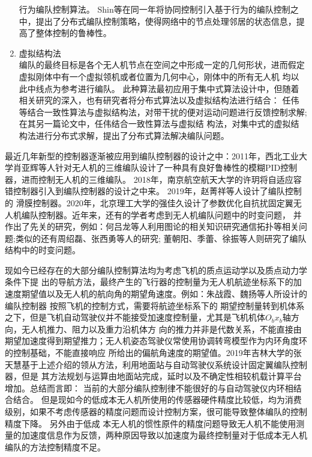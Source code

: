 \begin{enumerate}
        行为编队控制算法。\cite{DuanHaiBin2015}
        Shin等在同一年将协同控制引入基于行为的编队控制之中，提出了分布式编队控制策略，使得网络中的节点处理邻居的状态信息，提高了整体控制的鲁棒性。\cite{Jongho2015}
    \item 虚拟结构法\\
        编队的最终目标是各个无人机节点在空间之中形成一定的几何形状，进而假定虚拟刚体中有一个虚拟领机或者位置为几何中心，刚体中的所有无人机
        均以此中线点为参考进行编队。\cite{Lewis1997High}
        此种算法最初应用于集中式算法设计中，但随着相关研究的深入，也有研究者将分布式算法以及虚拟结构法进行结合：
        任伟等结合一致性算法与虚拟结构法，对带干扰的便对运动问题进行反馈控制求解\cite{Ren2004Formation};在其另一篇论文中，任伟结合一致性算法与虚拟结
        构法，对集中式的虚拟结构法进行分布式求解，提出了分布式算法解决编队问题。\cite{Ren2004Decentralized}
\end{enumerate}

最近几年新型的控制器逐渐被应用到编队控制器的设计之中：2011年，西北工业大学肖亚辉等人针对无人机的三维编队设计了一种具有良好鲁棒性的模糊PID控制器，进而控制无人机的三维编队。\cite{XiaoYaHui2011}
2018年，南京航空航天大学的许玥将自适应容错控制器引入到编队控制器的设计之中来。\cite{XuYue} 2019年，赵菁祥等人设计了编队控制的
滑膜控制器。2020年，北京理工大学的强佳久设计了参数优化自抗扰固定翼无人机编队控制器。\cite{MengXiuyun2020}近年来，还有的学者考虑到无人机编队问题中的时变问题，
并作出了先关的研究，例如：何吕龙等人利用图论的相关知识研究通信拓扑等相关问题\cite{Helvlong2020};类似的还有周绍磊\cite{Zhoushaolei2020}、张西勇\cite{Zhangxiyong2019}等人的研究;
董朝阳\cite{Dongzhaoyang2020}、季蕾\cite{Jilei2019}、徐振\cite{Xuzhen2019}等人则研究了编队结构中的时变问题。

现如今已经存在的大部分编队控制算法均为考虑飞机的质点运动学以及质点动力学条件下提
出的导航方法，最终产生的飞行器的控制量为无人机航迹坐标系下的加速度期望值以及无人机的航向角的期望角速度。例如：朱战霞、魏扬等人所设计的编队控制器
按照飞机的控制方式，需要将航迹坐标系下的
期望控制量转到机体系之下，但是飞机自动驾驶仪并不能接受加速度控制量，尤其是飞机机体$O_bx_b$轴方向，无人机推力、阻力以及重力沿机体方
向的推力并非是代数关系，不能直接由期望加速度得到期望推力；无人机姿态驾驶仪常使用协调转弯模型作为内环角度环的控制基础，不能直接响应
所给出的偏航角速度的期望值。2019年吉林大学的张天慧基于上述介绍的领从方法，利用地面站与自动驾驶仪系统设计固定翼编队控制器，\cite{Zhangtianhui2019}但是
其方法规划与运算由地面站完成，延时以及不确定性相较机载计算平台增加。总结而言即：
当前的大部分编队控制律不能很好的与自动驾驶仪内环相结合结合。
但是现如今的低成本无人机所使用的传感器硬件精度比较低，均为消费级别，如果不考虑传感器的精度问题而设计控制方案，很可能导致整体编队的控制精度下降。
另外由于低成
本无人机的惯性原件的精度问题导致无人机不能使用测量的加速度信息作为反馈，两种原因导致以加速度为最终控制量对于低成本无人机编队的方法控制精度不足。
